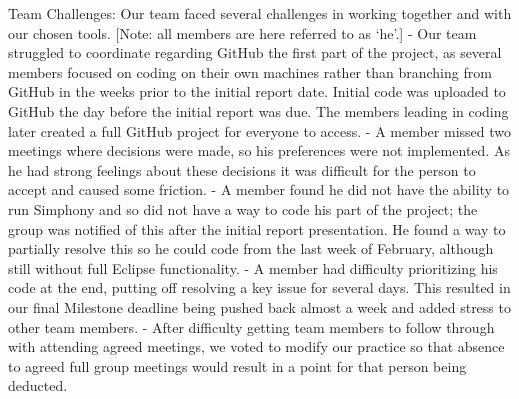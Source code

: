 \documentclass[11pt]{article}
\begin{document}
Team Challenges:
Our team faced several challenges in working together and with our chosen tools. [Note: all members are here referred to as ‘he’.] 
- Our team struggled to coordinate regarding GitHub the first part of the project, as several members focused on coding on their own machines rather than branching from GitHub in the weeks prior to the initial report date. Initial code was uploaded to GitHub the day before the initial report was due. The members leading in coding later created a full GitHub project for everyone to access. 
- A member missed two meetings where decisions were made, so his preferences were not implemented. As he had strong feelings about these decisions it was difficult for the person to accept and caused some friction.
- A member found he did not have the ability to run Simphony and so did not have a way to code his part of the project; the group was notified of this after the initial report presentation. He found a way to partially resolve this so he could code from the last week of February, although still without full Eclipse functionality. 
- A member had difficulty prioritizing his code at the end, putting off resolving a key issue for several days. This resulted in our final Milestone deadline being pushed back almost a week and added stress to other team members.
- After difficulty getting team members to follow through with attending agreed meetings, we voted to modify our practice so that absence to agreed full group meetings would result in a point for that person being deducted.
\end{document}
